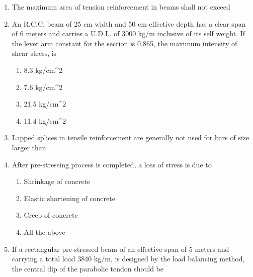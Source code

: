 \documentclass[11pt,a4paper]{article}
\begin{document}
\begin{enumerate}
\item{The maximum area of tension reinforcement in beams shall not exceed}
\\
\item{An R.C.C. beam of 25 cm width and 50 cm effective depth has a clear span of 6 meters and carries a U.D.L. of 3000 kg/m inclusive of its self weight. If the lever arm constant for the section is 0.865, the maximum intensity of shear stress, is}
\begin{enumerate}[label=\Alph*.]
\item{8.3 kg/cm\^{}2}
\item{7.6 kg/cm\^{}2}
\item{21.5 kg/cm\^{}2}
\item{11.4 kg/cm\^{}2}
\end{enumerate}
\item{Lapped splices in tensile reinforcement are generally not used for bars of size larger than}
\\
\item{After pre-stressing process is completed, a loss of stress is due to}
\begin{enumerate}[label=\Alph*.]
\item{Shrinkage of concrete}
\item{Elastic shortening of concrete}
\item{Creep of concrete}
\item{All the above}
\end{enumerate}
\item{If a rectangular pre-stressed beam of an effective span of 5 meters and carrying a total load 3840 kg/m, is designed by the load balancing method, the central dip of the parabolic tendon should be}
\\\begin{enumerate*}[itemjoin=\qquad, label=\Alph*.]

\end{enumerate*}
\end{enumerate}
\end{document}
